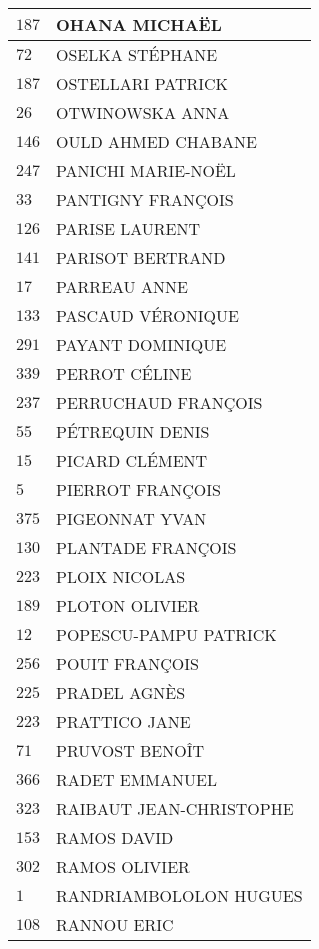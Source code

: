 \begin{xltabular}{\linewidth}{|l|X|}
    \hline
    $187$ & OHANA MICHAËL \\
    \hline
    $72$ & OSELKA STÉPHANE \\
    \hline
    $187$ & OSTELLARI PATRICK \\
    \hline
    $26$ & OTWINOWSKA ANNA \\
    \hline
    $146$ & OULD AHMED CHABANE \\
    \hline
    $247$ & PANICHI MARIE-NOËL \\
    \hline
    $33$ & PANTIGNY FRANÇOIS \\
    \hline
    $126$ & PARISE LAURENT \\
    \hline
    $141$ & PARISOT BERTRAND \\
    \hline
    $17$ & PARREAU ANNE \\
    \hline
    $133$ & PASCAUD VÉRONIQUE \\
    \hline
    $291$ & PAYANT DOMINIQUE \\
    \hline
    $339$ & PERROT CÉLINE \\
    \hline
    $237$ & PERRUCHAUD FRANÇOIS \\
    \hline
    $55$ & PÉTREQUIN DENIS \\
    \hline
    $15$ & PICARD CLÉMENT \\
    \hline
    $5$ & PIERROT FRANÇOIS \\
    \hline
    $375$ & PIGEONNAT YVAN \\
    \hline
    $130$ & PLANTADE FRANÇOIS \\
    \hline
    $223$ & PLOIX NICOLAS \\
    \hline
    $189$ & PLOTON OLIVIER \\
    \hline
    $12$ & POPESCU-PAMPU PATRICK \\
    \hline
    $256$ & POUIT FRANÇOIS \\
    \hline
    $225$ & PRADEL AGNÈS \\
    \hline
    $223$ & PRATTICO JANE \\
    \hline
    $71$ & PRUVOST BENOÎT \\
    \hline
    $366$ & RADET EMMANUEL \\
    \hline
    $323$ & RAIBAUT JEAN-CHRISTOPHE \\
    \hline
    $153$ & RAMOS DAVID \\
    \hline
    $302$ & RAMOS OLIVIER \\
    \hline
    $1$ & RANDRIAMBOLOLON HUGUES \\
    \hline
    $108$ & RANNOU ERIC \\

\end{xltabular}
